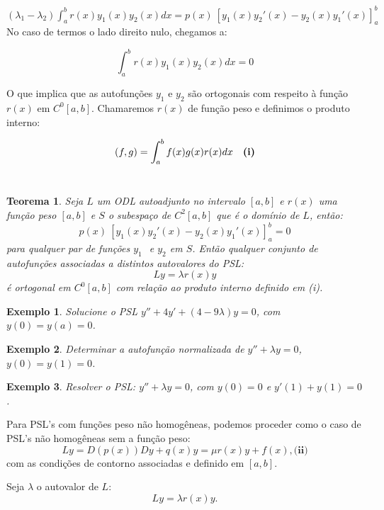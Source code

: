 \documentclass[a4paper,portuguese,9pt,final]{extarticle}
\newtheorem{theorem}{Teorema}[section]
\newtheorem{example}{Exemplo}[section]
\begin{document}
\begin{multicols*}{2}
\begin{itemize}
    $\displaystyle(\lambda_{1}-\lambda_{2}) \int_{a}^{b}r(x) y_{1}(x) y_{2}(x) dx = p(x) \ [y_{1}(x)y_{2}'(x) - y_{2}(x)y_{1}'(x)]_{a}^{b}$ \\



    No caso de termos o lado direito nulo, chegamos a:

    $$\displaystyle \int_{a}^{b}r(x) y_{1}(x) y_{2}(x) dx = 0$$ 


    O que implica que as autofunções $ y_{1} $ e $ y_{2} $ são ortogonais com respeito à função $ r(x) $ em $ C^{0}[a,b] $. Chamaremos $ r(x) $ de função peso e definimos o produto interno:

    $$ (f,g) = \displaystyle \int_{a}^{b} f(x) g(x) r(x)dx \mbox{ \ \ \textbf{(i)}} $$\

    \begin{theorem}	
        Seja $ L $ um ODL autoadjunto no intervalo $ [a,b] $ e $ r(x) $ uma função peso $ [a,b] $ e $ S $ o subespaço de $ C^{2}[a,b] $ que é o domínio de $ L $, então:
        $$ p(x) \ [y_{1}(x)y_{2}'(x) - y_{2}(x)y_{1}'(x)]_{a}^{b} = 0 $$
        para qualquer par de funções $ y_{1}$  $ $ e $ y_{2} $ em $S$. Então qualquer conjunto de autofunções associadas a distintos autovalores do PSL:
        $$ Ly=\lambda r(x)y $$
        é ortogonal em $ C^{0}[a,b] $ com relação ao produto interno definido em (i).
    \end{theorem}

    \begin{example}	
        Solucione o PSL $y'' + 4y' + (4- 9 \lambda)y =0$, com $y(0)=y(a)=0$.
    \end{example}

    \begin{example}	
        Determinar a autofunção normalizada de $y'' + \lambda y = 0$, $y(0)=y(1)=0$.
    \end{example}
    
    \begin{example}	
        Resolver o PSL: $y'' + \lambda y =0$, com $y(0) = 0$ e $y'(1) + y(1) =0$.
    \end{example}

    
    Para PSL's com funções peso não homogêneas, podemos proceder como o caso de PSL's não homogêneas sem a função peso:
    $$ Ly = D(p(x)) Dy + q(x)y = \mu r(x) y + f(x),\textbf{(ii)}$$
    com as condições de contorno associadas e definido em $ [a,b] $.  



    Seja $\lambda$ o autovalor de $ L $:
    $$ Ly = \lambda r(x) y.$$ 


\end{itemize}
\end{multicols*}
\end{document}
